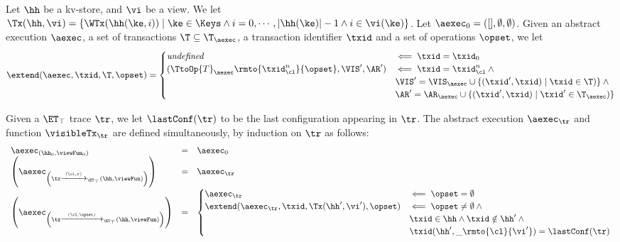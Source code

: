 \begin{definition}
Let $\hh$ be a kv-store, and $\vi$ be a view. We let $\Tx(\hh, \vi) = \{ \WTx(\hh(\ke, i)) \mid \ke \in \Keys \wedge 
i = 0,\cdots, \lvert \hh(\ke) \rvert - 1 \wedge i \in \vi(\ke) \}$. 
Let $\aexec_0 = ( [ ], \emptyset, \emptyset)$. Given an abstract execution $\aexec$, a set of transactions  
$\T \subseteq \T_{\aexec}$, a transaction identifier $\txid$ and a set of operations $\opset$, we let 
\[
\extend(\aexec, \txid, \T, \opset) = 
\begin{cases}
\textit{undefined} &\impliedby \txid = \txid_{0}\\
(\TtoOp{T}_{\aexec}\rmto{\txid_{\cl}^{n}}{\opset}, \VIS', \AR') & \impliedby \txid = \txid_{\cl}^{n} \wedge {}\\
& \VIS' = \VIS_{\aexec} \cup \{(\txid', \txid) \mid \txid \in \T)\} \wedge {}\\
& \AR' = \AR_{\aexec} \cup \{(\txid', \txid) \mid \txid' \in \T_{\aexec})\}\\
\end{cases}
\]

Given a $\ET_{\top}$ trace $\tr$, we let $\lastConf(\tr)$ to be the last configuration appearing in 
$\tr$. The abstract execution $\aexec_{\tr}$ and function $\visibleTx_{\tr}$ are defined 
simultaneously, by induction on $\tr$ as follows:
\[
\begin{array}{lcl}
\aexec_{(\hh_0, \viewFun_0)} &=& \aexec_0\\
\left(\aexec_{\left(\tr \xrightarrow{(\cl, \varepsilon)}_{\ET_{\top}} (\hh, \viewFun)\right)}\right) &=& 
\aexec_{\tr}\\
\left(\aexec_{\left(\tr \xrightarrow{(\cl, \opset)}_{\ET_{\top}} (\hh, \viewFun)\right)}\right) &=& 
\begin{cases}
\aexec_{\tr} &\impliedby \opset = \emptyset\\
\extend(\aexec_{\tr}, \txid, \Tx(\hh', \vi'), \opset) &\impliedby \opset \neq \emptyset \wedge {}\\
& \txid \in \hh \wedge \txid \notin \hh' \wedge{}\\
& \txid (\hh', \_\rmto{\cl}{\vi'}) = \lastConf(\tr)
\end{cases}
\end{array}
\]

\end{definition}

